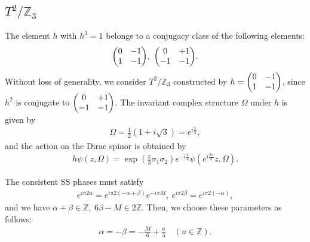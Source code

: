 \documentclass[11pt]{article}
\begin{document}
\subsection{ $T^2/ \mathbb{Z}_3$}

The element $h$ with $h^3=1$ belongs to a conjugacy class of the following elements:
\begin{align}
     \mqty(0 & -1 \\ 1 & -1),~\mqty(0 & +1 \\ -1 & -1).
\end{align}
Without loss of generality, we consider $T^2/ \mathbb{Z}_3$ constructed by $h=\mqty(0 & -1 \\ 1 & -1)$, since $h^2 $ is conjugate to $\mqty(0 & +1 \\ -1 & -1)$. The invariant complex structure $\Omega$ under $h$ is given by
\begin{align}
   \Omega= \frac{1}{2}( 1+ i\sqrt{3})=e^{i\frac{\pi}{3}},
\end{align}
and the action on the Dirac spinor is obtained by
\begin{align}
    h\psi(z,\Omega)= \exp(\frac{\pi}{3} \sigma_1 \sigma_2)e^{-i\frac{\pi}{3}} \psi( e^{i\frac{2\pi}{3}}z,\Omega).
\end{align}

The consistent SS phases must satisfy
\begin{align}
    e^{i\pi 2 \alpha}= e^{i\pi 2 ( - \alpha + \beta)} e^{-i\pi M},~e^{i\pi 2 \beta}= e^{i\pi 2 (-\alpha)},
\end{align}
and we have $\alpha +\beta \in \mathbb{Z},~ 6\beta-M \in 2\mathbb{Z}$. Then, we choose these parameters as follows:
\begin{align}
    \alpha =- \beta= -\frac{M}{6} + \frac{u}{3} \quad (u\in \mathbb{Z}).
\end{align}
\end{document}

